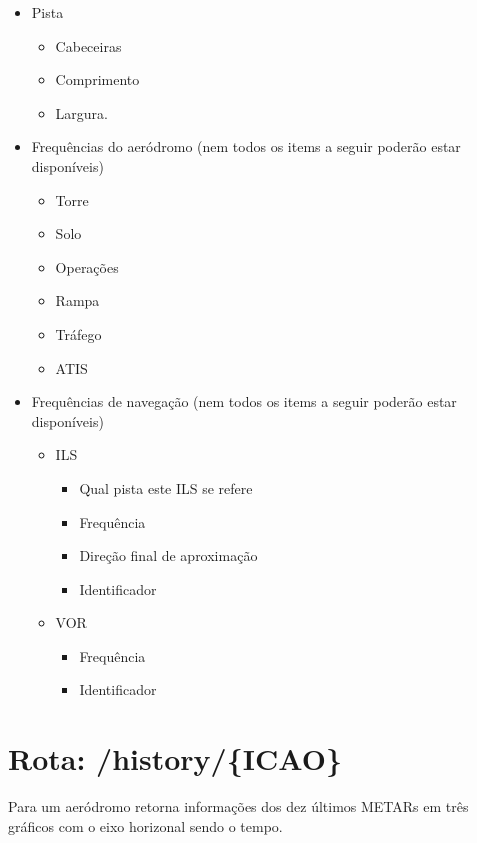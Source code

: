\begin{itemize}
    \item Pista
        \begin {itemize}
        \item Cabeceiras
        \item Comprimento
        \item Largura.
        \end {itemize}
    \item Frequências do aeródromo (nem todos os items a seguir poderão estar disponíveis)
    \begin{itemize}
        \item Torre
        \item Solo
        \item Operações
        \item Rampa
        \item Tráfego
        \item ATIS
    \end{itemize}
    \item Frequências de navegação (nem todos os items a seguir poderão estar disponíveis)
    \begin{itemize}
        \item ILS
            \begin{itemize}
                \item Qual pista este ILS se refere
                \item Frequência
                \item Direção final de aproximação
                \item Identificador
            \end{itemize}
        \item VOR
            \begin{itemize}
                \item Frequência
                \item Identificador
            \end{itemize}
    \end{itemize}

\end{itemize}

\section{Rota: /history/\{ICAO\}}
Para um aeródromo retorna informações dos dez últimos METARs em três
gráficos com o eixo horizonal sendo o tempo.

